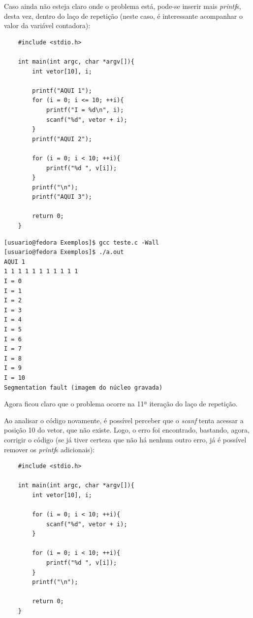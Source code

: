 \documentclass[12pt]{article}
\newcommand\tab[1][1cm]{\hspace*{#1}}
\begin{document}
\par\tab Caso ainda não esteja claro onde o problema está, pode-se inserir mais \textit{printf}s, desta vez, dentro do laço de repetição (neste caso, é interessante acompanhar o valor da variável contadora):

\hspace{0.25cm}
\begin{lstlisting}
    #include <stdio.h>
    
    int main(int argc, char *argv[]){
        int vetor[10], i;
        
        printf("AQUI 1");
        for (i = 0; i <= 10; ++i){
            printf("I = %d\n", i);
            scanf("%d", vetor + i);
        }
        printf("AQUI 2");
        
        for (i = 0; i < 10; ++i){
            printf("%d ", v[i]);
        }
        printf("\n");
        printf("AQUI 3");
        
        return 0;
    }
\end{lstlisting}

\hspace{0.25cm}
\begin{tcolorbox}[colback=black!5!white,colframe=black!75!white,title=Console: usuario@fedora:\~/Exemplos]
    \begin{verbatim}
[usuario@fedora Exemplos]$ gcc teste.c -Wall
[usuario@fedora Exemplos]$ ./a.out
AQUI 1
1 1 1 1 1 1 1 1 1 1 1
I = 0
I = 1
I = 2
I = 3
I = 4
I = 5
I = 6
I = 7
I = 8
I = 9
I = 10
Segmentation fault (imagem do núcleo gravada)
    \end{verbatim}
\end{tcolorbox}

\par\tab Agora ficou claro que o problema ocorre na 11ª iteração do laço de repetição.

\par\tab Ao analisar o código novamente, é possível perceber que o \textit{scanf} tenta acessar a posição 10 do vetor, que não existe. Logo, o erro foi encontrado, bastando, agora, corrigir o código (se já tiver certeza que não há nenhum outro erro, já é possível remover os \textit{printf}s adicionais):

\hspace{0.25cm}
\begin{lstlisting}
    #include <stdio.h>
    
    int main(int argc, char *argv[]){
        int vetor[10], i;
        
        for (i = 0; i < 10; ++i){
            scanf("%d", vetor + i);
        }
        
        for (i = 0; i < 10; ++i){
            printf("%d ", v[i]);
        }
        printf("\n");
        
        return 0;
    }
\end{lstlisting}
\end{document}
